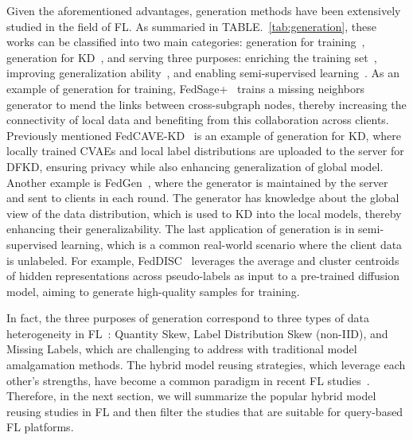 Given the aforementioned advantages, generation methods have been extensively studied in the field of FL. 
As summaried in TABLE.~\ref{tab:generation}, these works can be classified into two main categories: generation for training~\cite{zhang2021subgraph, cheng2023gfl, hao2021towards, cha2019federated, yu2023turning, heinbaugh2023data, yang2023exploring, liu2021feddg, pi2023dynafed, liz2022federated, diao2022semifl}, generation for KD~\cite{zhang2022dense, chen2020fedbe, zhu2021data, zhang2022fine, jeong2018communication, jin2023feddyn, heinbaugh2023data, zhang2022fedzkt, fan2022private}, and serving three purposes: enriching the training set~\cite{zhang2022dense, chen2020fedbe, zhang2021subgraph, cheng2023gfl, cha2019federated, jin2023feddyn, zhang2022fedzkt}, improving generalization ability~\cite{zhu2021data, zhang2022fine, hao2021towards, jeong2018communication, yu2023turning, heinbaugh2023data, liu2021feddg, pi2023dynafed, liz2022federated}, and enabling semi-supervised learning~\cite{yang2023exploring, diao2022semifl, fan2022private}.
As an example of generation for training, FedSage+~\cite{zhang2021subgraph} trains a missing neighbors generator to mend the links between cross-subgraph nodes, thereby increasing the connectivity of local data and benefiting from this collaboration across clients.
Previously mentioned FedCAVE-KD~\cite{heinbaugh2023data} is an example of generation for KD, where locally trained CVAEs and local label distributions are uploaded to the server for DFKD, ensuring privacy while also enhancing generalization of global model.
Another example is FedGen~\cite{zhu2021data}, where the generator is maintained by the server and sent to clients in each round.
The generator has knowledge about the global view of the data distribution, which is used to KD into the local models, thereby enhancing their generalizability.
The last application of generation is in semi-supervised learning, which is a common real-world scenario where the client data is unlabeled.
For example, FedDISC~\cite{yang2023exploring} leverages the average and cluster centroids of hidden representations across pseudo-labels as input to a pre-trained diffusion model, aiming to generate high-quality samples for training.

In fact, the three purposes of generation correspond to three types of data heterogeneity in FL~\cite{liqb2022federated}: Quantity Skew, Label Distribution Skew (non-IID), and Missing Labels, which are challenging to address with traditional model amalgamation methods.
The hybrid model reusing strategies, which leverage each other's strengths, have become a common paradigm in recent FL studies~\cite{cheng2023gfl, xie2023perada, yu2023turning, jin2023feddyn, heinbaugh2023data, yang2023exploring, zhang2023navigating}.
Therefore, in the next section, we will summarize the popular hybrid model reusing studies in FL and then filter the studies that are suitable for query-based FL platforms.

